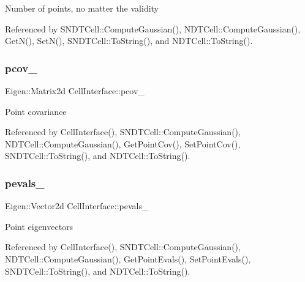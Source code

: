 Number of points, no matter the validity 

Referenced by S\+N\+D\+T\+Cell\+::\+Compute\+Gaussian(), N\+D\+T\+Cell\+::\+Compute\+Gaussian(), Get\+N(), Set\+N(), S\+N\+D\+T\+Cell\+::\+To\+String(), and N\+D\+T\+Cell\+::\+To\+String().

\mbox{\label{classCellInterface_ae940f0f4946d6dad966f13d89a447182}} 
\subsubsection{\texorpdfstring{pcov\+\_\+}{pcov\_}}
{\footnotesize\ttfamily Eigen\+::\+Matrix2d Cell\+Interface\+::pcov\+\_\+\hspace{0.3cm}{\ttfamily [protected]}}

Point covariance 

Referenced by Cell\+Interface(), S\+N\+D\+T\+Cell\+::\+Compute\+Gaussian(), N\+D\+T\+Cell\+::\+Compute\+Gaussian(), Get\+Point\+Cov(), Set\+Point\+Cov(), S\+N\+D\+T\+Cell\+::\+To\+String(), and N\+D\+T\+Cell\+::\+To\+String().

\mbox{\label{classCellInterface_abe2d8e173c39dbed8eb23d111837fa57}} 
\subsubsection{\texorpdfstring{pevals\+\_\+}{pevals\_}}
{\footnotesize\ttfamily Eigen\+::\+Vector2d Cell\+Interface\+::pevals\+\_\+\hspace{0.3cm}{\ttfamily [protected]}}

Point eigenvectors 

Referenced by Cell\+Interface(), S\+N\+D\+T\+Cell\+::\+Compute\+Gaussian(), N\+D\+T\+Cell\+::\+Compute\+Gaussian(), Get\+Point\+Evals(), Set\+Point\+Evals(), S\+N\+D\+T\+Cell\+::\+To\+String(), and N\+D\+T\+Cell\+::\+To\+String().

\mbox{\label{classCellInterface_adb945c67c87d8255a3a6b8c9c30d4c92}} 
